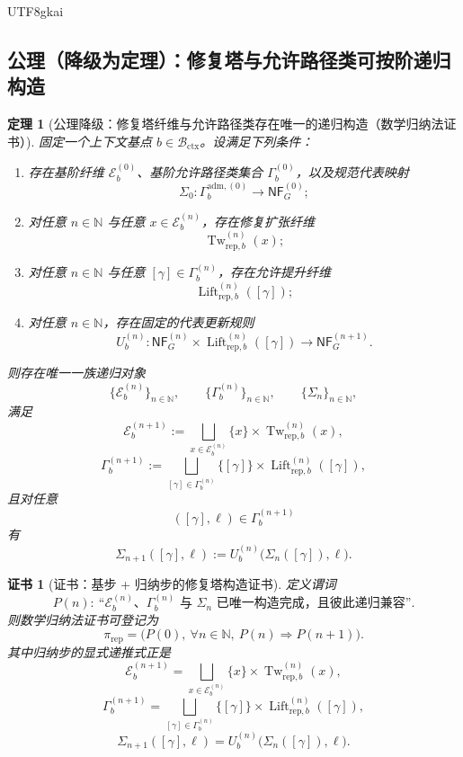 \documentclass[12pt]{article}
\newtheorem{theorem}{定理}[section]
\newtheorem{Certificate}{证书}[section]
\begin{document}
\begin{CJK*}{UTF8}{gkai}
\subsection{公理（降级为定理）：修复塔与允许路径类可按阶递归构造}
\label{subsec:tex37-ch4-axiom-downgrade}

\begin{theorem}[公理降级：修复塔纤维与允许路径类存在唯一的递归构造（数学归纳法证书）]
\label{thm:tex37-ch4-tower-induction}
固定一个上下文基点 $b\in\mathcal{B}_{\mathrm{ctx}}$。设满足下列条件：
\begin{enumerate}
  \item 存在基阶纤维 $\mathcal{E}_b^{(0)}$、基阶允许路径类集合 $\Gamma_b^{(0)}$，以及规范代表映射
  \[
    \Sigma_0:\Gamma_b^{\mathrm{adm},(0)}\to \mathsf{NF}_G^{(0)};
  \]
  \item 对任意 $n\in\mathbb{N}$ 与任意 $x\in \mathcal{E}_b^{(n)}$，存在修复扩张纤维
  \[
    \operatorname{Tw}_{\mathrm{rep},b}^{(n)}(x);
  \]
  \item 对任意 $n\in\mathbb{N}$ 与任意 $[\gamma]\in \Gamma_b^{(n)}$，存在允许提升纤维
  \[
    \operatorname{Lift}_{\mathrm{rep},b}^{(n)}([\gamma]);
  \]
  \item 对任意 $n\in\mathbb{N}$，存在固定的代表更新规则
  \[
    U_b^{(n)}:
    \mathsf{NF}_G^{(n)}
    \times
    \operatorname{Lift}_{\mathrm{rep},b}^{(n)}([\gamma])
    \to
    \mathsf{NF}_G^{(n+1)}.
  \]
\end{enumerate}
则存在唯一一族递归对象
\[
  \{\mathcal{E}_b^{(n)}\}_{n\in\mathbb{N}},
  \qquad
  \{\Gamma_b^{(n)}\}_{n\in\mathbb{N}},
  \qquad
  \{\Sigma_n\}_{n\in\mathbb{N}},
\]
满足
\[
  \mathcal{E}_b^{(n+1)}
  :=
  \bigsqcup_{x\in\mathcal{E}_b^{(n)}}
  \{x\}\times \operatorname{Tw}_{\mathrm{rep},b}^{(n)}(x),
\]
\[
  \Gamma_b^{(n+1)}
  :=
  \bigsqcup_{[\gamma]\in\Gamma_b^{(n)}}
  \{[\gamma]\}\times \operatorname{Lift}_{\mathrm{rep},b}^{(n)}([\gamma]),
\]
且对任意
\[
  ([\gamma],\ell)\in \Gamma_b^{(n+1)}
\]
有
\[
  \Sigma_{n+1}([\gamma],\ell)
  :=
  U_b^{(n)}\bigl(\Sigma_n([\gamma]),\ell\bigr).
\]
\end{theorem}

\begin{Certificate}[证书：基步 + 归纳步的修复塔构造证书]
\label{cert:tex37-ch4-tower-induction}
定义谓词
\[
  P(n):\ \text{“$\mathcal{E}_b^{(n)}$、$\Gamma_b^{(n)}$ 与 $\Sigma_n$ 已唯一构造完成，且彼此递归兼容”}.
\]
则数学归纳法证书可登记为
\[
  \pi_{\mathrm{rep}}
  =
  \bigl(
    P(0),\
    \forall n\in\mathbb{N},\ P(n)\Rightarrow P(n+1)
  \bigr).
\]
其中归纳步的显式递推式正是
\[
  \mathcal{E}_b^{(n+1)}
  =
  \bigsqcup_{x\in\mathcal{E}_b^{(n)}}
  \{x\}\times \operatorname{Tw}_{\mathrm{rep},b}^{(n)}(x),
\]
\[
  \Gamma_b^{(n+1)}
  =
  \bigsqcup_{[\gamma]\in\Gamma_b^{(n)}}
  \{[\gamma]\}\times \operatorname{Lift}_{\mathrm{rep},b}^{(n)}([\gamma]),
\]
\[
  \Sigma_{n+1}([\gamma],\ell)
  =
  U_b^{(n)}\bigl(\Sigma_n([\gamma]),\ell\bigr).
\]
\end{Certificate}


\end{CJK*}
\end{document}
